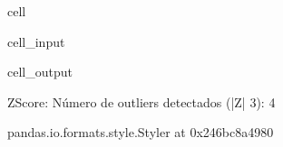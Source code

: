 \documentclass[a4paper,10pt,spanish]{jupyterBook}
\begin{document}
\begin{sphinxuseclass}{cell}
\begin{sphinxVerbatimInput}
\begin{sphinxuseclass}{cell_input}
\end{sphinxuseclass}\end{sphinxVerbatimInput}
\begin{sphinxVerbatimOutput}

\begin{sphinxuseclass}{cell_output}
\begin{sphinxVerbatim}[commandchars=\\\{\}]
Z\PYGZhy{}Score: Número de outliers detectados (|Z| \PYGZgt{} 3): 4
\end{sphinxVerbatim}

\begin{sphinxVerbatim}[commandchars=\\\{\}]
\PYGZlt{}pandas.io.formats.style.Styler at 0x246bc8a4980\PYGZgt{}
\end{sphinxVerbatim}

\end{sphinxuseclass}\end{sphinxVerbatimOutput}

\end{sphinxuseclass}
\end{document}
